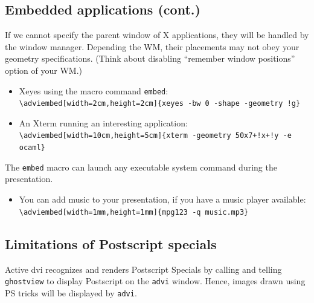\documentclass[12pt]{article}
\begin{document}
\newpage

\subsection* {Embedded applications (cont.)}

If we cannot specify the parent window of X applications,
they will be handled by the window manager.
Depending the WM, 
their placements may not obey your geometry specifications.
(Think about disabling ``remember window positions'' option of your WM.)

\begin{itemize}
 \item Xeyes using the macro command \verb|embed|:\\
   \verb|\adviembed[width=2cm,height=2cm]{xeyes -bw 0 -shape -geometry !g}|\\

 \item An Xterm running an interesting application:\\
   \verb|\adviembed[width=10cm,height=5cm]{xterm -geometry 50x7+!x+!y -e ocaml}|\\
\end{itemize}

The \verb|embed| macro can launch any executable system command during
the presentation. 
\begin{itemize}
 \item You can add music to your presentation, if you have a music
  player available:\\
  \verb|\adviembed[width=1mm,height=1mm]{mpg123 -q music.mp3}|
\end{itemize}


\newpage

\subsection* {Limitations of Postscript specials}

Active dvi recognizes and renders Postscript Specials by calling and telling
\verb"ghostview" to display Postscript on the \verb"advi" window. 
Hence, images drawn using PS tricks will be displayed by \verb"advi". 
\end{document}
